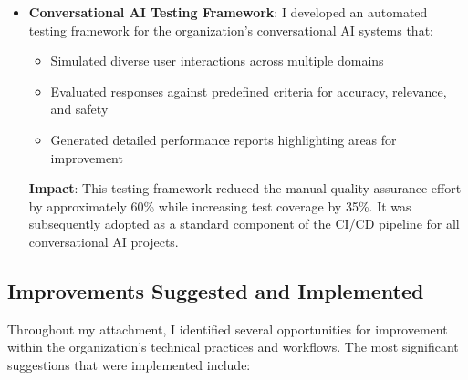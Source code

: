 \documentclass[12pt,a4paper]{article}
\begin{document}
\begin{itemize}
    \item \textbf{Conversational AI Testing Framework}: I developed an automated testing framework for the organization's conversational AI systems that:
    \begin{itemize}
        \item Simulated diverse user interactions across multiple domains
        \item Evaluated responses against predefined criteria for accuracy, relevance, and safety
        \item Generated detailed performance reports highlighting areas for improvement
    \end{itemize}
    \textbf{Impact}: This testing framework reduced the manual quality assurance effort by approximately 60\% while increasing test coverage by 35\%. It was subsequently adopted as a standard component of the CI/CD pipeline for all conversational AI projects.
\end{itemize}


\subsection{Improvements Suggested and Implemented}

Throughout my attachment, I identified several opportunities for improvement within the organization's technical practices and workflows. The most significant suggestions that were implemented include:
\end{document}
